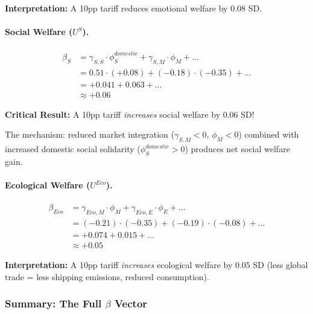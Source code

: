 \textbf{Interpretation:} A 10pp tariff reduces emotional welfare by 0.08 SD.

\paragraph{Social Welfare ($U^S$).}
\begin{align}
\beta_S &= \gamma_{S,S} \cdot \phi_S^{domestic} + \gamma_{S,M} \cdot \phi_M + \ldots \nonumber \\
&= 0.51 \cdot (+0.08) + (-0.18) \cdot (-0.35) + \ldots \nonumber \\
&= +0.041 + 0.063 + \ldots \nonumber \\
&\approx \mathbf{+0.06}
\end{align}

\textbf{Critical Result:} A 10pp tariff \emph{increases} social welfare by 0.06 SD!

The mechanism: reduced market integration ($\gamma_{S,M} < 0$, $\phi_M < 0$) 
combined with increased domestic social solidarity ($\phi_S^{domestic} > 0$) 
produces net social welfare gain.

\paragraph{Ecological Welfare ($U^{Eco}$).}
\begin{align}
\beta_{Eco} &= \gamma_{Eco,M} \cdot \phi_M + \gamma_{Eco,E} \cdot \phi_E + \ldots \nonumber \\
&= (-0.21) \cdot (-0.35) + (-0.19) \cdot (-0.08) + \ldots \nonumber \\
&= +0.074 + 0.015 + \ldots \nonumber \\
&\approx \mathbf{+0.05}
\end{align}

\textbf{Interpretation:} A 10pp tariff \emph{increases} ecological welfare by 0.05 SD 
(less global trade = less shipping emissions, reduced consumption).

\subsubsection{Summary: The Full $\beta$ Vector}

